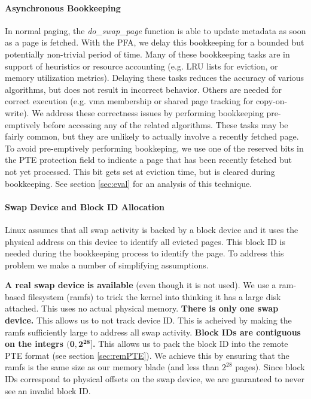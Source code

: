 \paragraph{Asynchronous Bookkeeping}
In normal paging, the \emph{do\_swap\_page} function is able to update metadata as
soon as a page is fetched. With the PFA, we delay this bookkeeping for a
bounded but potentially non-trivial period of time. Many of these bookkeeping
tasks are in support of heuristics or resource accounting (e.g. LRU lists for
eviction, or memory utilization metrics). Delaying these tasks reduces the
accuracy of various algorithms, but does not result in incorrect behavior.
Others are needed for correct execution (e.g. \gls{vma} membership or shared
page tracking for copy-on-write). We address these correctness issues by
performing bookkeeping pre-emptively before accessing any of the related
algorithms. These tasks may be fairly common, but they are unlikely to actually
involve a recently fetched page. To avoid pre-emptively performing bookkeping,
we use one of the reserved bits in the PTE protection field to indicate a page
that has been recently fetched but not yet processed. This bit gets set at
eviction time, but is cleared during bookkeeping. See section \ref{sec:eval}
for an analysis of this technique. 

\paragraph{Swap Device and Block ID Allocation}
Linux assumes that all swap activity is backed by a block device and it uses
the physical address on this device to identify all evicted pages. This block
ID is needed during the bookkeeping process to identify the page. To address
this problem we make a number of simplifying assumptions.

\begin{outline}[enumerate]
	\1 \textbf{A real swap device is available} (even though it is not used). We
		use a ram-based filesystem (ramfs) to trick the kernel into thinking it has
		a large disk attached. This uses no actual physical memory.
	\1 \textbf{There is only one swap device.} This allows us to not track device
		ID. This is acheived by making the ramfs sufficiently large to address all
		swap activity.
	\1 \textbf{Block IDs are contiguous on the integrs $\mathbf{(0, 2^{28}]}$.}
		This allows us to pack the block ID into the remote PTE format (see section
		\ref{sec:remPTE}). We achieve this by ensuring that the ramfs is the same
		size as our memory blade (and less than $2^{28}$ pages). Since block IDs
		correspond to physical offsets on the swap device, we are guaranteed to
		never see an invalid block ID.
\end{outline}

